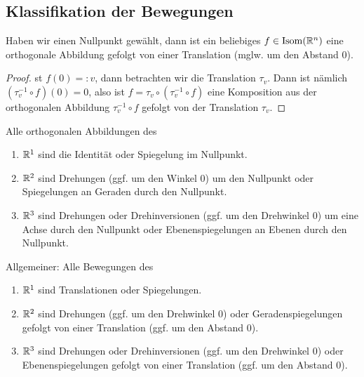 \subsection{Klassifikation der Bewegungen}

\begin{lemma}
Haben wir einen Nullpunkt gewählt, dann ist ein beliebiges $f\in\operatorname{Isom}(\mathbb{R}^n)$ eine orthogonale Abbildung gefolgt von einer Translation (mglw. um den Abstand $0$).
\end{lemma}
\begin{proof}
st $f(0)=:v$, dann betrachten wir die Translation $\tau_v$. Dann ist nämlich $(\tau_v^{-1}\circ f)(0) = 0$, also ist $f=\tau_v\circ(\tau_v^{-1}\circ f)$ eine Komposition aus der orthogonalen Abbildung $\tau_v^{-1}\circ f$ gefolgt von der Translation $\tau_v$.
\end{proof}

\begin{theorem}
Alle orthogonalen Abbildungen des
\begin{enumerate}
\item $\mathbb{R}^1$ sind die Identität oder Spiegelung im Nullpunkt.
\item $\mathbb{R}^2$ sind Drehungen (ggf. um den Winkel $0$) um den Nullpunkt oder Spiegelungen an Geraden durch den Nullpunkt.
\item $\mathbb{R}^3$ sind Drehungen oder Drehinversionen (ggf. um den Drehwinkel $0$) um eine Achse durch den Nullpunkt oder Ebenenspiegelungen an Ebenen durch den Nullpunkt.
\end{enumerate}

Allgemeiner: Alle Bewegungen des
\begin{enumerate}
\item $\mathbb{R}^1$ sind Translationen oder Spiegelungen.
\item $\mathbb{R}^2$ sind Drehungen (ggf. um den Drehwinkel $0$) oder Geradenspiegelungen gefolgt von einer Translation (ggf. um den Abstand $0$).
\item $\mathbb{R}^3$ sind Drehungen oder Drehinversionen (ggf. um den Drehwinkel $0$) oder Ebenenspiegelungen gefolgt von einer Translation (ggf. um den Abstand $0$).
\end{enumerate}
\end{theorem}